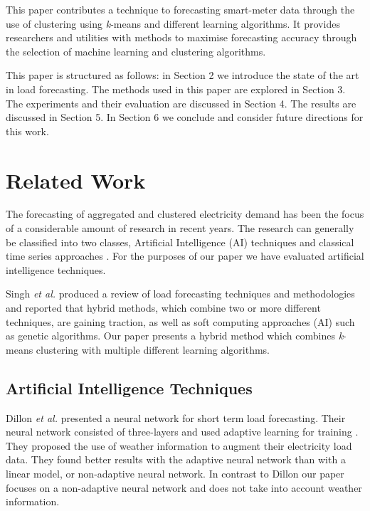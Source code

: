 This paper contributes a technique to forecasting smart-meter data through the use of clustering using \textit{k}-means and different learning algorithms. It provides researchers and utilities with methods to maximise forecasting accuracy through the selection of machine learning and clustering algorithms.

This paper is structured as follows: in Section 2 we introduce the state of the art in load forecasting. The methods used in this paper are explored in Section 3. The experiments and their evaluation are discussed in Section 4. The results are discussed in Section 5. In Section 6 we conclude and consider future directions for this work.

\section{Related Work}

The forecasting of aggregated and clustered electricity demand has been the focus of a considerable amount of research in recent years. The research can generally be classified into two classes, Artificial Intelligence (AI) techniques \cite{Kim2000, Tiong2008,Quilumba2014} and classical time series approaches \cite{Nazarko2005ARIMAApproach,Huang2003,Nguyen2017}. For the purposes of our paper we have evaluated artificial intelligence techniques.

Singh \textit{et al.} \cite{Singh2012} produced a review of load forecasting techniques and methodologies and reported that hybrid methods, which combine two or more different techniques, are gaining traction, as well as soft computing approaches (AI) such as genetic algorithms. Our paper presents a hybrid method which combines \textit{k}-means clustering with multiple different learning algorithms.

\subsection{Artificial Intelligence Techniques}

Dillon \textit{et al.} presented a neural network for short term load forecasting. Their neural network consisted of three-layers and used adaptive learning for training \cite{Dillon1991}. They proposed the use of weather information to augment their electricity load data. They found better results with the adaptive neural network than with a linear model, or non-adaptive neural network. In contrast to Dillon our paper focuses on a non-adaptive neural network and does not take into account weather information.

